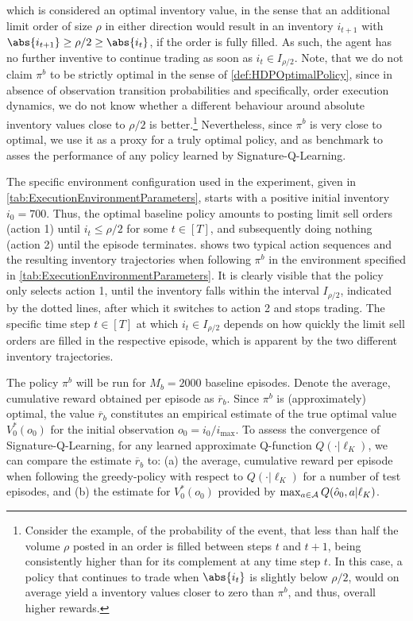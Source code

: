 \documentclass[
    a4paper,
    11pt,
    bibliography=totoc,
    listof=totoc,      
    headinclude=true,
    cleardoublepage=empty,
]{scrbook}
\theoremstyle{plain}
\theoremstyle{definition}
\theoremstyle{remark}
\newcommand{\SpaceA}{{\cal A}}
\begin{document}
which is considered an optimal inventory value, in the sense that an 
additional limit 
order of size $\rho$ in either direction would result in an inventory 
$i_{t+1}$ with $\abs{i_{t+1}}\geq\rho/2 \geq \abs{i_t}$, if the order is fully 
filled. As such, the agent has no further inventive to continue trading as 
soon as $i_t \in I_{\rho/2}$. Note, that we do not claim $\pi^b$ to 
be strictly optimal in the sense of \cref{def:HDPOptimalPolicy}, since in 
absence of observation transition probabilities and specifically, order 
execution dynamics, we do not know whether a different behaviour around 
absolute inventory values close to $\rho/2$ is better.\footnote{
    Consider the example, of the probability of the event, that 
    less than half the volume $\rho$ posted in an order is filled between 
    steps $t$ and $t+1$, being consistently higher than for its complement at 
    any time step $t$. In this case, a policy that continues to trade when 
    $\abs{i_t}$ is slightly below $\rho/2$, would on average yield a inventory 
    values closer to zero than $\pi^b$, and thus, overall higher rewards.
} 
Nevertheless, since $\pi^b$ is very close to optimal, we use it as a proxy for 
a truly optimal policy, and as benchmark to asses the performance of any 
policy learned by Signature-Q-Learning.

The specific environment configuration used in the experiment, given in 
\cref{tab:ExecutionEnvironmentParameters}, starts with a positive initial 
inventory $i_0=700$. Thus, the optimal baseline policy amounts to posting 
limit sell orders (action 1) until $i_{t} \leq \rho/2$ for some $t\in[T]$, and 
subsequently doing nothing (action 2) until the episode terminates. 
 shows two typical action sequences and the 
resulting inventory trajectories when following $\pi^b$ in the environment 
specified in \cref{tab:ExecutionEnvironmentParameters}. It is 
clearly visible that the policy only selects action 1, until the inventory 
falls within the interval $I_{\rho/2}$, indicated by the dotted lines, after 
which it switches to action 2 and stops trading. The specific time step 
$t\in[T]$ at which $i_t \in I_{\rho/2}$ depends on how quickly the limit 
sell orders are filled in the respective episode, which is apparent by the two 
different inventory trajectories.

The policy $\pi^b$ will be run for $M_b=2000$ baseline episodes. Denote the 
average, cumulative reward obtained per episode as $\overline r_b$. Since 
$\pi^b$ is (approximately) optimal, the value $\overline r_b$ constitutes an 
empirical estimate of the true optimal value $V_0^*(o_0)$ for the initial 
observation $o_0 = i_0/i_{\max}$. To assess the convergence of 
Signature-Q-Learning, for any learned approximate Q-function $Q(\cdot|
\ell_K)$, we can compare the estimate $\overline r_b$ to: (a) the average, 
cumulative reward per episode when following the greedy-policy with respect to 
$Q(\cdot|\ell_K)$ for a number of test episodes, and (b) the estimate for 
$V_0^*(o_0)$ provided by $\max_{a\in\SpaceA}Q(\hat o_0, a|\ell_K)$.
\end{document}
